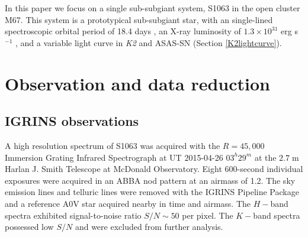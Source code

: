 \documentclass[twocolumn]{emulateapj}%
\begin{document}
In this paper we focus on a single sub-subgiant system, S1063 in the open cluster M67. This system is a prototypical sub-subgiant star, with an single-lined spectroscopic orbital period of 18.4 days \citep{geller17}, an X-ray luminosity of $1.3\times10^{31}$ erg s$^{-1}$ \citep{vandenberg99}, and a variable light curve in \textit{K2} and ASAS-SN (Section \ref{K2lightcurve}).


\section{Observation and data reduction}
\subsection{IGRINS observations}
A high resolution spectrum of S1063 was acquired with the $R=45,000$ Immersion Grating Infrared Spectrograph \citep[IGRINS;][]{park14} at UT 2015-04-26 $03^h29^m$ at the $2.7\;$m Harlan J. Smith Telescope at McDonald Observatory.  Eight 600-second individual exposures were acquired in an ABBA nod pattern at an airmass of 1.2.  The sky emission lines and telluric lines were removed with the IGRINS Pipeline Package  \citep[PLP;][]{jaejoonlee16} and a reference A0V star acquired nearby in time and airmass.
The $H-$band spectra exhibited signal-to-noise ratio $S/N\sim50$ per pixel.
The $K-$band spectra possessed low $S/N$ and were excluded from further analysis.
\end{document}
